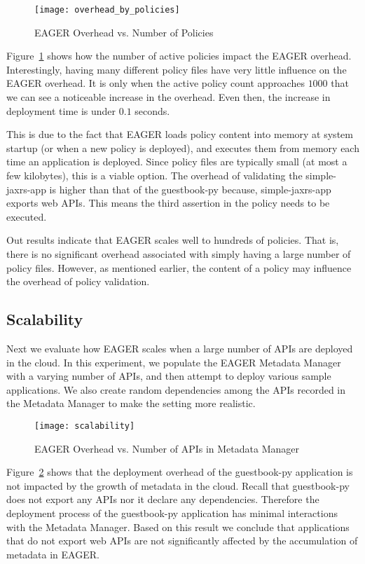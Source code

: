 \begin{figure}
\centering
\texttt{[image: overhead\_by\_policies]}
\caption{EAGER Overhead vs. Number of Policies}
\label{fig:overhead_by_policies}
\end{figure}

Figure~\ref{fig:overhead_by_policies} shows how the number of active policies
impact the EAGER overhead. Interestingly, having many different policy files
have very little influence on the EAGER overhead. It is only when the active
policy count approaches $1000$ that we can see a noticeable increase in the
overhead. Even then, the increase in deployment time is under $0.1$ seconds. 

This is due to the fact that EAGER loads policy content into memory at system
startup (or when a new policy is deployed), and executes them from memory each
time an application is deployed. Since policy files are typically small (at
most a few kilobytes), this is a viable option. The overhead of validating the
simple-jaxrs-app is higher than that of the guestbook-py because,
simple-jaxrs-app exports web APIs. This means the third assertion in the
policy needs to be executed. 

Out results indicate that EAGER scales well to hundreds of policies. That is,
there is no significant overhead associated with simply having a large number
of policy files. However, as mentioned earlier, the content of a policy may
influence the overhead of policy validation.
 
\subsection{Scalability}
Next we evaluate how EAGER scales when a large number of APIs are deployed in the cloud. In this experiment, we populate the EAGER
Metadata Manager with a varying number of APIs, and then attempt to deploy various sample applications. We also create
random dependencies among the APIs recorded in the Metadata Manager to make the setting more realistic.

\begin{figure}
\centering
\texttt{[image: scalability]}
\caption{EAGER Overhead vs. Number of APIs in Metadata Manager}
\label{fig:scalability}
\end{figure}

Figure~\ref{fig:scalability} shows that the deployment overhead of the guestbook-py application is not impacted by the growth of metadata
in the cloud. Recall that guestbook-py does not export any APIs nor it declare any dependencies. Therefore the deployment process of
the guestbook-py application has minimal interactions with the Metadata Manager. Based on this result we conclude that applications that
do not export web APIs are not significantly affected by the accumulation of metadata in EAGER.

